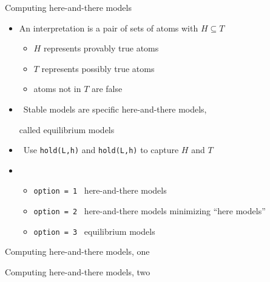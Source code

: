 \begin{frame}{Computing here-and-there models}
  \bigskip
  \begin{itemize}
  \item<1-> An {interpretation} is a pair  of sets of atoms with $H \subseteq T$
    \begin{itemize}\normalsize
    \item $H$ represents provably true atoms
    \item $T$ represents possibly true atoms
    \item atoms not in $T$ are false
    \end{itemize}
  \item<2->  \ Stable models are specific here-and-there models,
    \par called \alert<2>{equilibrium models}
    \bigskip
  \item<3->  \ Use \lstinline{hold(L,h)} and \lstinline{hold(L,h)} to capture $H$ and $T$
    \medskip
  \item<4-> 
    \begin{itemize}\normalsize
    \item \texttt{option = 1} \ here-and-there models
    \item \texttt{option = 2} \ here-and-there models minimizing ``here models''
    \item \texttt{option = 3} \ equilibrium models
    \end{itemize}
  \end{itemize}
\end{frame}
\begin{frame}[fragile]{Computing here-and-there models, one}
  \bigskip
  
\end{frame}
\begin{frame}[fragile,shrink=40]{Computing here-and-there models, two}
  \bigskip
  
\end{frame}
%
